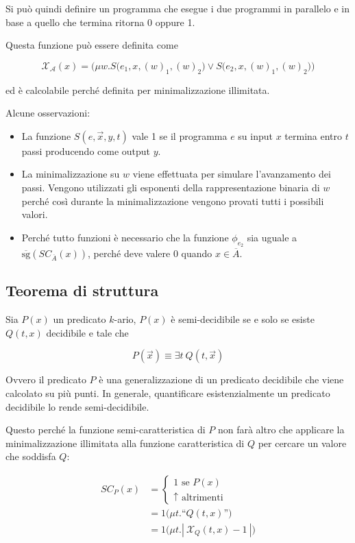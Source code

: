 Si può quindi definire un programma che esegue i due programmi in parallelo e in base a quello che termina ritorna 0 oppure 1.

Questa funzione può essere definita come 

$$
\mathcal{X_A}(x) = \Bigg( \mu w . S\bigg( e_1, x, (w)_1, (w)_2\bigg)  \vee S\bigg( e_2, x, (w)_1, (w)_2\bigg)  \Bigg)
$$

ed è calcolabile perché definita per minimalizzazione illimitata.

Alcune osservazioni:

\begin{itemize}
	\item La funzione $S(e, \vec{x}, y, t)$ vale 1 se il programma $e$ su input $x$ termina entro $t$ passi producendo come output $y$.
	\item La minimalizzazione su $w$ viene effettuata per simulare l'avanzamento dei passi. Vengono utilizzati gli esponenti della rappresentazione binaria di $w$ perché così durante la minimalizzazione vengono provati tutti i possibili valori.
	\item Perché tutto funzioni è necessario che la funzione $\phi_{e_2}$ sia uguale a $\overline{\text{sg}} (SC_{\overline{A}} (x))$, perché deve valere 0 quando $x \in \overline{A}$.
\end{itemize}

\subsection{Teorema di struttura}

Sia $P(x)$ un predicato $k$-ario, $P(x)$ è semi-decidibile se e solo se esiste $Q(t,x)$ decidibile e tale che

$$
P(\vec{x}) \equiv \exists t \: Q(t,\vec{x})
$$

Ovvero il predicato $P$ è una generalizzazione di un predicato decidibile che viene calcolato su più punti. In generale, quantificare esistenzialmente un predicato decidibile lo rende semi-decidibile.

Questo perché la funzione semi-caratteristica di $P$ non farà altro che applicare la minimalizzazione illimitata alla funzione caratteristica di $Q$ per cercare un valore che soddisfa $Q$:

\begin{align*}
	SC_P(x) &= \begin{cases}
		1 \text{ se } P(x)\\
		\uparrow \text{ altrimenti}
	\end{cases} \\
	&= 1 \bigg( \mu t. \text{``} Q(t,x)\text{''} \bigg) \\
	&= 1 \bigg( \mu t. | \: \mathcal{X}_Q(t,x) - 1 \: | \bigg)
\end{align*}

